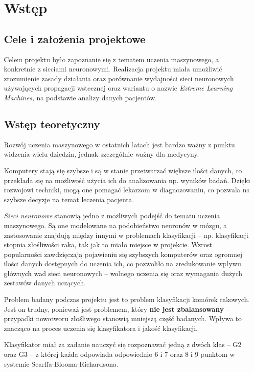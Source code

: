 \chapter{Wstęp}
\section{Cele i założenia projektowe}
Celem projektu było zapoznanie się z tematem uczenia maszynowego, a konkretnie z sieciami neuronowymi.
Realizacja projektu miała umożliwić zrozumienie zasady działania oraz porównanie wydajności sieci neuronowych używających propagacji wstecznej oraz wariantu o nazwie \textit{Extreme Learning Machines,} na podstawie analizy danych pacjentów.
\section{Wstęp teoretyczny}
Rozwój uczenia maszynowego w ostatnich latach jest bardzo ważny z punktu widzenia wielu dziedzin, jednak szczególnie ważny dla medycyny.

Komputery stają się szybsze i są w stanie przetwarzać większe ilości danych, co przekłada się na możliwość użycia ich do analizowania np. wyników badań.
Dzięki rozwojowi techniki, mogą one pomagać lekarzom w diagnozowaniu, co pozwala na szybsze decyzje na temat leczenia pacjenta.

\textit{Sieci neuronowe} stanowią jedno z możliwych podejść do tematu uczenia maszynowego.
Są one modelowane na podobieństwo neuronów w mózgu, a zastosowanie znajdują między innymi w problemach klasyfikacji -- np. klasyfikacji stopnia złośliwości raka, tak jak to miało miejsce w projekcie.
Wzrost popularności zawdzięczają pojawieniu się szybszych komputerów oraz ogromnej ilości danych dostępnych do uczenia ich, co pozwoliło na zredukowanie wpływu głównych wad sieci neuronowych -- wolnego uczenia się oraz wymagania dużych zestawów danych uczących.

Problem badany podczas projektu jest to problem klasyfikacji komórek rakowych. Jest on trudny, ponieważ jest problemem, który \textbf{nie jest zbalansowany} -- przypadki nowotworu złośliwego stanowią mniejszą część badanych. Wpływa to znacząco na proces uczenia się klasyfikatora i jakość klasyfikacji.

Klasyfikator miał za zadanie nauczyć się rozpoznawać jedną z dwóch klas -- G2 oraz G3 -- z której każda odpowiada odpowiednio 6 i 7 oraz 8 i 9 punktom w systemie Scarffa-Blooma-Richardsona.
